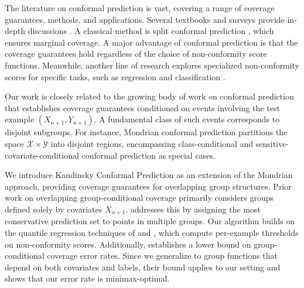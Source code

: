 The literature on conformal prediction is vast, covering a range of coverage guarantees, methods, and applications. Several textbooks and surveys provide in-depth discussions \citep{AlgorithmicLearning2005, SV08, BHV14, ABB24}. A classical method is split conformal prediction \citep{PPVG02, LGRTW18}, which ensures marginal coverage. A major advantage of conformal prediction is that the coverage guarantees hold regardless of the choice of non-conformity score functions. Meanwhile, another line of research explores specialized non-conformity scores for specific tasks, such as regression \citep{LeiRW2013, RPC19, IzbickiSS20} and classification \citep{SLW19, ABMJ20, RSC20}.


Our work is closely related to the growing body of work on conformal prediction that establishes coverage guarantees conditioned on events involving the test example $(X_{n+1}, Y_{n+1})$. A fundamental class of such events corresponds to disjoint subgroups. For instance, Mondrian conformal prediction \citep{VLNG03} partitions the space  $\mathcal{X} \times \mathcal{Y}$ into disjoint regions, encompassing class-conditional \citep{LBLJ15, DABJT23} and sensitive-covariate-conditional \citep{RBSC20} conformal prediction as special cases. 

We introduce Kandinsky Conformal Prediction as an extension of the Mondrian approach, providing coverage guarantees for overlapping group structures. Prior work on overlapping group-conditional coverage primarily considers groups defined solely by covariates  $X_{n+1}$. \citet{BCRT21} addresses this by assigning the most conservative prediction set to points in multiple groups. Our algorithm builds on the quantile regression techniques of \citet{JNRR2023} and \citet{GCC2023}, which compute per-example thresholds on non-conformity scores. Additionally, \citet{ACDR24} establishes a lower bound on group-conditional coverage error rates. Since we generalize to group functions that depend on both covariates and labels, their bound applies to our setting and shows that our error rate is minimax-optimal.


